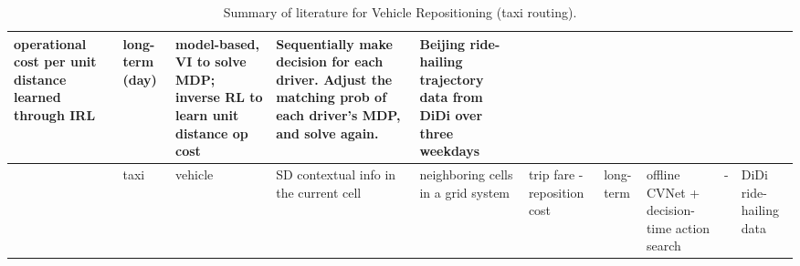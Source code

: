 \documentclass{article}
\begin{document}
\begin{table}
\begin{tabular}{||p{}|p{}|p{}|p{}|p{}|p{}|p{}|p{}|p{}|p{}||}
operational cost per unit distance learned through IRL & long-term (day) & model-based, VI to solve MDP;
inverse RL to learn unit distance op cost & Sequentially make decision for each driver. Adjust the matching prob of each driver's MDP, and solve again. & Beijing ride-hailing trajectory data from DiDi over three weekdays \\
\hline
\cite{jtq2021repos} & taxi & vehicle & SD contextual info in the current cell & neighboring cells in a grid system & trip fare - reposition cost & long-term & offline CVNet + decision-time action search & - & DiDi ride-hailing data \\
\hline
\hline
\end{tabular}
\caption{Summary of literature for Vehicle Repositioning (taxi routing).}
\label{tab:ref_reposition_taxi}
\end{table}
\end{document}
